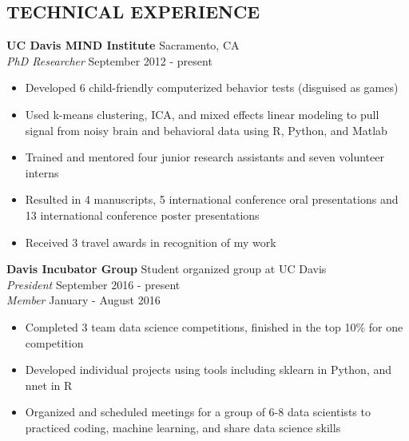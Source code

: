 \documentclass[line,margin,10pt]{res}
\begin{document}
\begin{resume}
\section{TECHNICAL EXPERIENCE}
\textbf{UC Davis MIND Institute} \hfill Sacramento, CA \\
{\sl PhD Researcher} \hfill September 2012 - present
\begin{itemize} \itemsep -2pt
\item Developed 6 child-friendly computerized behavior tests (disguised as games)
\item Used k-means clustering, ICA, and mixed effects linear modeling to pull signal from noisy brain and behavioral data using R, Python, and Matlab
\item Trained and mentored four junior research assistants and seven volunteer interns
\item Resulted in 4 manuscripts, 5 international conference oral presentations and 13 international conference poster presentations
\item Received 3 travel awards in recognition of my work
\end{itemize}

\textbf{Davis Incubator Group} \hfill Student organized group at UC Davis\\
{\sl President} \hfill September 2016 - present\\
{\sl Member} \hfill January - August 2016 
\begin{itemize} \itemsep -2pt
\item Completed 3 team data science competitions, finished in the top 10\% for one competition
\item Developed individual projects using tools including sklearn in Python, and nnet in R
\item Organized and scheduled meetings for a group of 6-8 data scientists to practiced coding, machine learning, and share data science skills
\end{itemize}


\end{resume}
\end{document}
